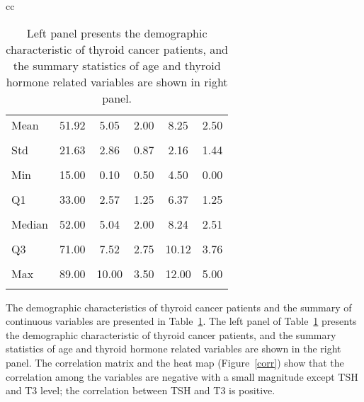 \documentclass[11pt,a4paper]{article}
\begin{document}
\begin{table}[H]
\begin{tabular}{cc}
\begin{minipage}{.45\linewidth}
\begin{tabular}{|l|c|c|c|c|c|}
Mean          & 51.92  & 5.05   & 2.00   & 8.25   & 2.50 \\
              &        &        &        &        &      \\\hline
Std           & 21.63  & 2.86   & 0.87   & 2.16   & 1.44 \\
              &        &        &        &        &      \\\hline
Min           & 15.00  & 0.10   & 0.50   & 4.50   & 0.00 \\
              &        &        &        &        &      \\\hline
Q1            & 33.00  & 2.57   & 1.25   & 6.37   & 1.25 \\
              &        &        &        &        &      \\\hline
Median        & 52.00  & 5.04   & 2.00   & 8.24   & 2.51 \\
              &        &        &        &        &      \\\hline
Q3            & 71.00  & 7.52   & 2.75   & 10.12  & 3.76 \\
              &        &        &        &        &      \\\hline
Max           & 89.00  & 10.00  & 3.50   & 12.00  & 5.00 \\
              &        &        &        &        &      \\\hline
\end{tabular}
    \end{minipage} 
\end{tabular}
\caption{Left panel presents the demographic characteristic of thyroid cancer patients, and the summary statistics of age and thyroid hormone related variables are shown in right panel.}\label{demog}
\end{table}

The demographic characteristics of thyroid cancer patients and the summary of continuous variables are presented in Table~\ref{demog}. The left panel of Table~\ref{demog} presents the demographic characteristic of thyroid cancer patients, and the summary statistics of age and thyroid hormone related variables are shown in the right panel. The correlation matrix and the heat map (Figure~\ref{corr}) show that the correlation among the variables are negative with a small magnitude except TSH and T3 level; the correlation between TSH and T3 is positive.   
\end{document}
